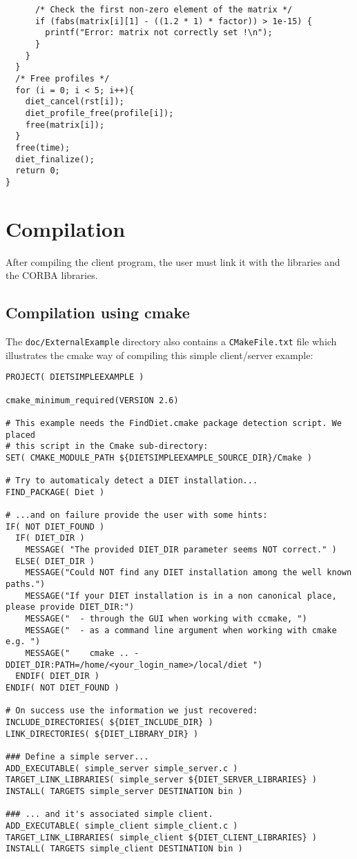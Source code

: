 {\begin{verbatim}
      /* Check the first non-zero element of the matrix */
      if (fabs(matrix[i][1] - ((1.2 * 1) * factor)) > 1e-15) {
        printf("Error: matrix not correctly set !\n");
      }
    }
  }
  /* Free profiles */
  for (i = 0; i < 5; i++){
    diet_cancel(rst[i]);
    diet_profile_free(profile[i]);
    free(matrix[i]);
  }
  free(time);
  diet_finalize();
  return 0;
}
\end{verbatim}
}

\section{Compilation}
\label{sec:cl_comp}

After compiling the client program, the user must link it with the
\diet libraries and the CORBA libraries.

\subsection{Compilation using cmake}

The \texttt{doc/ExternalExample} directory also contains a
\texttt{CMakeFile.txt} file which illustrates the cmake way of compiling
this simple client/server example:
{\footnotesize
\begin{verbatim}
PROJECT( DIETSIMPLEEXAMPLE )

cmake_minimum_required(VERSION 2.6)

# This example needs the FindDiet.cmake package detection script. We placed
# this script in the Cmake sub-directory:
SET( CMAKE_MODULE_PATH ${DIETSIMPLEEXAMPLE_SOURCE_DIR}/Cmake )

# Try to automaticaly detect a DIET installation...
FIND_PACKAGE( Diet )

# ...and on failure provide the user with some hints:
IF( NOT DIET_FOUND )
  IF( DIET_DIR ) 
    MESSAGE( "The provided DIET_DIR parameter seems NOT correct." )
  ELSE( DIET_DIR ) 
    MESSAGE("Could NOT find any DIET installation among the well known paths.")
    MESSAGE("If your DIET installation is in a non canonical place, please provide DIET_DIR:")
    MESSAGE("  - through the GUI when working with ccmake, ")
    MESSAGE("  - as a command line argument when working with cmake e.g. ")
    MESSAGE("    cmake .. -DDIET_DIR:PATH=/home/<your_login_name>/local/diet ")
  ENDIF( DIET_DIR ) 
ENDIF( NOT DIET_FOUND )

# On success use the information we just recovered: 
INCLUDE_DIRECTORIES( ${DIET_INCLUDE_DIR} )
LINK_DIRECTORIES( ${DIET_LIBRARY_DIR} )

### Define a simple server...
ADD_EXECUTABLE( simple_server simple_server.c )
TARGET_LINK_LIBRARIES( simple_server ${DIET_SERVER_LIBRARIES} )
INSTALL( TARGETS simple_server DESTINATION bin )

### ... and it's associated simple client.
ADD_EXECUTABLE( simple_client simple_client.c )
TARGET_LINK_LIBRARIES( simple_client ${DIET_CLIENT_LIBRARIES} )
INSTALL( TARGETS simple_client DESTINATION bin )
\end{verbatim}
}

